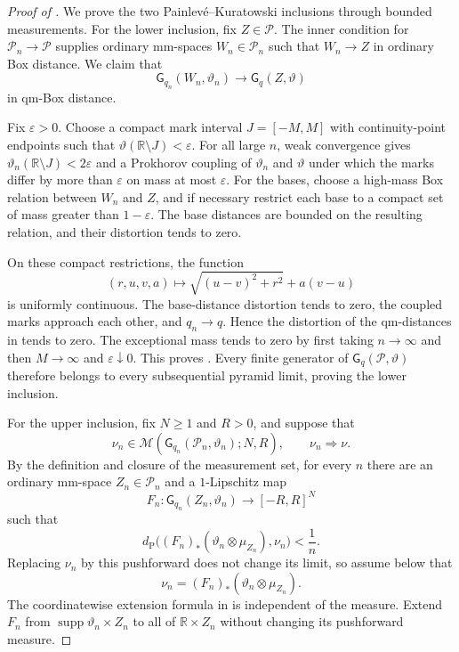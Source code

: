 \documentclass{amsart}
\numberwithin{equation}{section}
\theoremstyle{plain}
\theoremstyle{definition}
\theoremstyle{remark}
\newcommand{\R}{\mathbb R}
\DeclareMathOperator{\supp}{supp}
\begin{document}
\begin{proof}[Proof of ]
We prove the two Painlev\'e--Kuratowski inclusions through bounded measurements.  For the lower inclusion, fix
$Z\in\mathcal P$.  The inner condition for $\mathcal P_n\to\mathcal P$ supplies ordinary mm-spaces
$W_n\in\mathcal P_n$ such that $W_n\to Z$ in ordinary Box distance.  We claim that
\begin{equation}\label{eq:directed-generator-box-limit}
 \mathsf G_{q_n}(W_n,\vartheta_n)
 \longrightarrow
 \mathsf G_q(Z,\vartheta)
\end{equation}
in qm-Box distance.

Fix $\varepsilon>0$.  Choose a compact mark interval $J=[-M,M]$ with continuity-point endpoints such that
$\vartheta(\R\setminus J)<\varepsilon$.  For all large $n$, weak convergence gives
$\vartheta_n(\R\setminus J)<2\varepsilon$ and a Prokhorov coupling of $\vartheta_n$ and $\vartheta$ under which the marks
differ by more than $\varepsilon$ on mass at most $\varepsilon$.  For the bases, choose a high-mass Box relation between
$W_n$ and $Z$, and if necessary restrict each base to a compact set of mass greater than $1-\varepsilon$.  The base
distances are bounded on the resulting relation, and their distortion tends to zero.

On these compact restrictions, the function
\[
 (r,u,v,a)\longmapsto
 \sqrt{(u-v)^2+r^2}+a(v-u)
\]
is uniformly continuous.  The base-distance distortion tends to zero, the coupled marks approach each other, and
$q_n\to q$.  Hence the distortion of the qm-distances in  tends to zero.  The exceptional mass tends
to zero by first taking $n\to\infty$ and then $M\to\infty$ and $\varepsilon\downarrow0$.  This proves
.  Every finite generator of
$\mathsf G_q(\mathcal P,\vartheta)$ therefore belongs to every subsequential pyramid limit, proving the lower inclusion.

For the upper inclusion, fix $N\ge1$ and $R>0$, and suppose that
\[
 \nu_n\in
 \mathcal M(\mathsf G_{q_n}(\mathcal P_n,\vartheta_n);N,R),
 \qquad \nu_n\Rightarrow\nu.
\]
By the definition and closure of the measurement set, for every $n$ there are an ordinary mm-space
$Z_n\in\mathcal P_n$ and a $1$-Lipschitz map
\[
 F_n\colon\mathsf G_{q_n}(Z_n,\vartheta_n)\longrightarrow[-R,R]^N
\]
such that
\[
 d_{\mathrm P}\bigl((F_n)_*(\vartheta_n\otimes\mu_{Z_n}),\nu_n\bigr)<\frac1n.
\]
Replacing $\nu_n$ by this pushforward does not change its limit, so assume below that
\[
 \nu_n=(F_n)_*(\vartheta_n\otimes\mu_{Z_n}).
\]
The coordinatewise extension formula in  is independent of the measure.  Extend $F_n$ from
$\supp\vartheta_n\times Z_n$ to all of $\R\times Z_n$ without changing its pushforward measure.


\end{proof}
\end{document}
